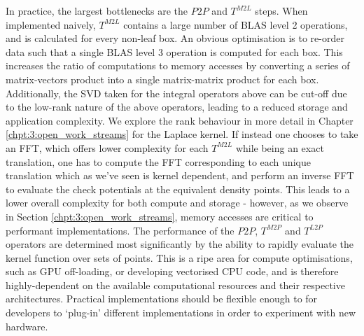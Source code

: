 In practice, the largest bottlenecks are the $P2P$ and $T^{M2L}$ steps. When implemented naively, $T^{M2L}$ contains a large number of BLAS level 2 operations, and is calculated for every non-leaf box. An obvious optimisation is to re-order data such that a single BLAS level 3 operation is computed for each box. This increases the ratio of computations to memory accesses by converting a series of matrix-vectors product into a single matrix-matrix product for each box. Additionally, the SVD taken for the integral operators above can be cut-off due to the low-rank nature of the above operators, leading to a reduced storage and application complexity. We explore the rank behaviour in more detail in Chapter \ref{chpt:3:open_work_streams} for the Laplace kernel. If instead one chooses to take an FFT, which offers lower complexity for each $T^{M2L}$ while being an exact translation, one has to compute the FFT corresponding to each unique translation which as we've seen is kernel dependent, and perform an inverse FFT to evaluate the check potentials at the equivalent density points. This leads to a lower overall complexity for both compute and storage - however, as we observe in Section \ref{chpt:3:open_work_streams}, memory accesses are critical to performant implementations. The performance of the $P2P$, $T^{M2P}$ and $T^{L2P}$ operators are determined most significantly by the ability to rapidly evaluate the kernel function over sets of points. This is a ripe area for compute optimisations, such as GPU off-loading, or developing vectorised CPU code, and is therefore highly-dependent on the available computational resources and their respective architectures. Practical implementations should be flexible enough to for developers to `plug-in' different implementations in order to experiment with new hardware.

